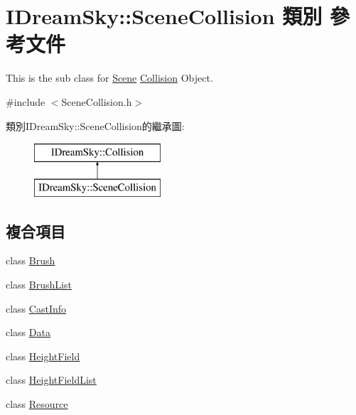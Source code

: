 \hypertarget{class_i_dream_sky_1_1_scene_collision}{}\section{I\+Dream\+Sky\+:\+:Scene\+Collision 類別 參考文件}
\label{class_i_dream_sky_1_1_scene_collision}


This is the sub class for \hyperlink{class_i_dream_sky_1_1_scene}{Scene} \hyperlink{class_i_dream_sky_1_1_collision}{Collision} Object.  




{\ttfamily \#include $<$Scene\+Collision.\+h$>$}

類別\+I\+Dream\+Sky\+:\+:Scene\+Collision的繼承圖\+:\begin{figure}[H]
\begin{center}
\leavevmode
\includegraphics[height=2.000000cm]{class_i_dream_sky_1_1_scene_collision}
\end{center}
\end{figure}
\subsection*{複合項目}
\begin{DoxyCompactItemize}
\item 
class \hyperlink{class_i_dream_sky_1_1_scene_collision_1_1_brush}{Brush}
\item 
class \hyperlink{class_i_dream_sky_1_1_scene_collision_1_1_brush_list}{Brush\+List}
\item 
class \hyperlink{class_i_dream_sky_1_1_scene_collision_1_1_cast_info}{Cast\+Info}
\item 
class \hyperlink{class_i_dream_sky_1_1_scene_collision_1_1_data}{Data}
\item 
class \hyperlink{class_i_dream_sky_1_1_scene_collision_1_1_height_field}{Height\+Field}
\item 
class \hyperlink{class_i_dream_sky_1_1_scene_collision_1_1_height_field_list}{Height\+Field\+List}
\item 
class \hyperlink{class_i_dream_sky_1_1_scene_collision_1_1_resource}{Resource}
\end{DoxyCompactItemize}
